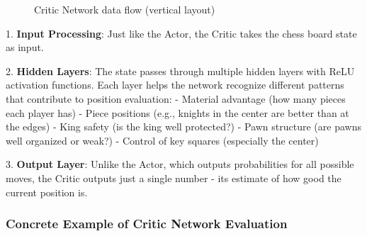 \documentclass[11pt]{article}
\begin{document}
\begin{figure}[p]
    \caption{Critic Network data flow (vertical layout)}
    \label{fig:critic_flow}
\end{figure}

1. \textbf{Input Processing}: Just like the Actor, the Critic takes the chess board state as input.

2. \textbf{Hidden Layers}: The state passes through multiple hidden layers with ReLU activation functions. Each layer helps the network recognize different patterns that contribute to position evaluation:
   - Material advantage (how many pieces each player has)
   - Piece positions (e.g., knights in the center are better than at the edges)
   - King safety (is the king well protected?)
   - Pawn structure (are pawns well organized or weak?)
   - Control of key squares (especially the center)

3. \textbf{Output Layer}: Unlike the Actor, which outputs probabilities for all possible moves, the Critic outputs just a single number - its estimate of how good the current position is.

\subsubsection*{Concrete Example of Critic Network Evaluation}
\end{document}

